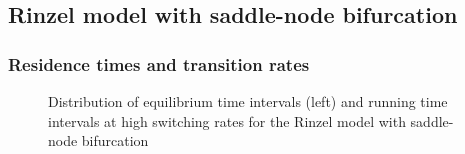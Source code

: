 \documentclass[12pt,a4paper]{article}
\begin{document}
\subsection{Rinzel model with saddle-node bifurcation}\label{tstrinzel}
\subsubsection{Residence times and transition rates}
 
\begin{figure}[H]
	\hspace*{-0.5cm}
	\caption{Distribution of equilibrium time intervals (left) and running time intervals at high switching rates for the Rinzel model with saddle-node bifurcation}
	\label{intdistrinzel}
\end{figure}
\end{document}

